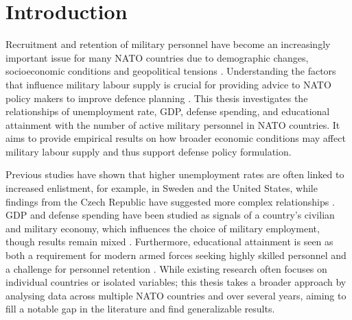 \chapter{Introduction}

Recruitment and retention of military personnel have become an increasingly 
important issue for many NATO countries due to demographic changes, socioeconomic 
conditions and geopolitical tensions \parencite{nato_research_and_technology_organization_recruiting_2007,nato_nato_2022}.
Understanding the factors that influence military labour supply is crucial for providing 
advice to NATO policy makers to improve defence planning \parencite{nato_research_and_technology_organization_recruiting_2007}.
This thesis investigates the relationships of
unemployment rate, GDP, defense spending, and educational attainment with
the number of active military personnel in NATO countries.
It aims to provide empirical results on how broader economic conditions 
may affect military labour supply and thus support defense policy formulation.

Previous studies have shown that higher unemployment rates are often 
linked to increased enlistment, for example, in Sweden and the United States, 
while findings from the Czech Republic have suggested more complex relationships
\parencite{backstrom_are_2019,asch_cash_2010,holcner_military_2021}. 
GDP and defense spending have been studied as signals of a country’s 
civilian and military economy, which influences the choice of military employment, 
though results remain mixed \parencite{warner_chapter_1995,holcner_military_2021}. 
Furthermore, educational attainment is seen as both a requirement for modern armed forces seeking highly skilled personnel 
and a challenge for personnel retention
\parencite{cnas_resources_and_force_readiness_division_fiscal_nodate,hof_quality_2023}. 
While existing research 
often focuses on individual countries or isolated variables; this thesis takes a 
broader approach by analysing data across multiple NATO countries and over several years, 
aiming to fill a notable gap in the literature and find generalizable results.